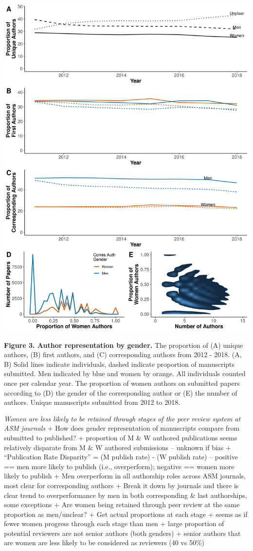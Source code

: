 \documentclass[11pt,]{article}
\begin{document}
\includegraphics{Figure_3.png}

\textbf{Figure 3. Author representation by gender.} The proportion of
(A) unique authors, (B) first authors, and (C) corresponding authors
from 2012 - 2018. (A, B) Solid lines indicate individuals, dashed
indicate proportion of manuscripts submitted. Men indicated by blue and
women by orange. All individuals counted once per calendar year. The
proportion of women authors on submitted papers according to (D) the
gender of the corresponding author or (E) the number of authors. Unique
manuscripts submitted from 2012 to 2018.

\emph{Women are less likely to be retained through stages of the peer
review system at ASM journals} + How does gender representation of
manuscripts compare from submitted to published? + proportion of M \& W
authored publications seems relatively disparate from M \& W authored
submissions -- unknown if bias + ``Publication Rate Disparity'' = (M
publish rate) - (W publish rate) -- positive == men more likely to
publish (i.e., overperform); negative == women more likely to publish +
Men overperform in all authorship roles across ASM journals, most clear
for corresponding authors + Break it down by journals and there is clear
trend to overperformance by men in both corresponding \& last
authorships, some exceptions + Are women being retained through peer
review at the same proportion as men/unclear? + Get actual proportions
at each stage + seems as if fewer women progress through each stage than
men + large proportion of potential reviewers are not senior authors
(both genders) + senior authors that are women are less likely to be
considered as reviewers (40 vs 50\%)
\end{document}
